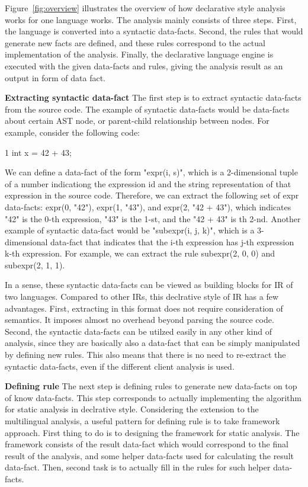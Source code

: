 Figure~\ref{fig:overview} illustrates the overview of how declarative style analysis works for
one language works. The analysis mainly
consists of three steps. First, the language is converted into a syntactic
data-facts. Second, the rules that would generate new facts are defined, and
these rules correspond to the actual implementation of the analysis. Finally, the
declarative language engine is executed with the given data-facts and rules,
giving the analysis result as an output in form of data fact.

\textbf{Extracting syntactic data-fact}
The first step is to extract syntactic data-facts from the source code.
The example of syntactic data-facts would be data-facts about certain
AST node, or parent-child relationship between nodes. For example, consider
the following code:

1 int x = 42 + 43;

We can define a data-fact of the form "expr(i, s)", which is a 2-dimensional
tuple of a number indicationg the expression id and the string representation
of that expression in the source code.  Therefore, we can extract the following
set of expr data-facts: expr(0, "42"), expr(1, "43"), and expr(2, "42 + 43"),
which indicates "42" is the 0-th expression, "43" is the 1-st, and the "42 +
43" is th 2-nd.  Another example of syntactic data-fact would be "subexpr(i, j,
k)", which is a 3-dimensional data-fact that indicates that the i-th expression
has j-th expression k-th expression. For example, we can extract the rule
subexpr(2, 0, 0) and subexpr(2, 1, 1).

In a sense, these syntactic data-facts can be viewed as building blocks for IR
of two languages.  Compared to other IRs, this declrative style of IR has a few
advantages. First, extracting in this format does not require consideration of
semantics.  It imposes almost no overhead beyond parsing the source code.
Second, the syntactic data-facts can be utilzed easily in any other kind of
analysis, since they are basically also a data-fact that can be simply
manipulated by defining new rules.  This also means that there is no need to
re-extract the syntactic data-facts, even if the different client analysis is
used.

\textbf{Defining rule}
The next step is defining rules to generate new data-facts on top of know
data-facts. This step corresponds to actually implementing the algorithm for
static analysis in declrative style. Considering the extension to the
multilingual analysis, a useful pattern for defining rule is to take framework
approach.  First thing to do is to designing the framework for static analysis.
The framework consists of the result data-fact which would correspond to the
final result of the analysis, and some helper data-facts used for calculating
the result data-fact. Then, second task is to actually fill in the rules for
such helper data-facts.

